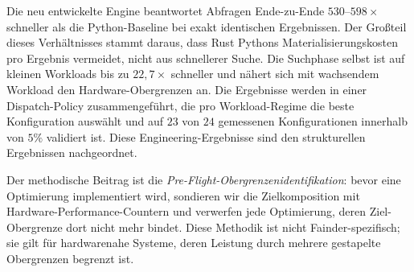 Die neu entwickelte Engine beantwortet Abfragen Ende-zu-Ende $530$--$598\times$ schneller als die Python-Baseline bei exakt identischen Ergebnissen. Der Gro\ss{}teil dieses Verh\"{a}ltnisses stammt daraus, dass Rust Pythons Materialisierungskosten pro Ergebnis vermeidet, nicht aus schnellerer Suche. Die Suchphase selbst ist auf kleinen Workloads bis zu $22{,}7\times$ schneller und n\"{a}hert sich mit wachsendem Workload den Hardware-Obergrenzen an. Die Ergebnisse werden in einer Dispatch-Policy zusammengef\"{u}hrt, die pro Workload-Regime die beste Konfiguration ausw\"{a}hlt und auf $23$ von $24$ gemessenen Konfigurationen innerhalb von $5\%$ validiert ist. Diese Engineering-Ergebnisse sind den strukturellen Ergebnissen nachgeordnet.

Der methodische Beitrag ist die \emph{Pre-Flight-Obergrenzenidentifikation}: bevor eine Optimierung implementiert wird, sondieren wir die Zielkomposition mit Hardware-Performance-Countern und verwerfen jede Optimierung, deren Ziel-Obergrenze dort nicht mehr bindet. Diese Methodik ist nicht Fainder-spezifisch; sie gilt f\"{u}r hardwarenahe Systeme, deren Leistung durch mehrere gestapelte Obergrenzen begrenzt ist.
